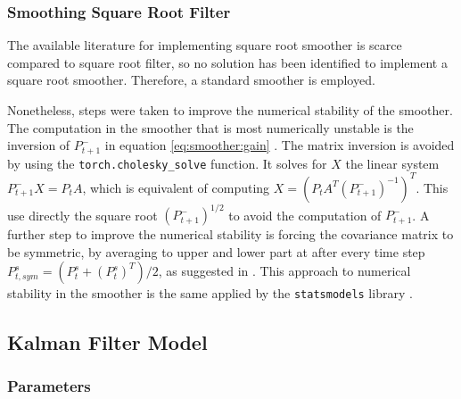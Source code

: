 \documentclass{article}
\let\Oldsubsection\subsection
\renewcommand{\subsection}{\FloatBarrier\Oldsubsection}
\begin{document}
\subsubsection{Smoothing Square Root Filter}

The available literature for implementing square root smoother is scarce compared to square root filter, so no solution has been identified to implement a square root smoother. Therefore, a standard smoother is employed.

Nonetheless, steps were taken to improve the numerical stability of the smoother. The computation in the smoother that is most numerically unstable is the inversion of $P^-_{t+1}$ in equation \ref{eq:smoother:gain} \cite{mohinder_s_grewal_kalman_2001}. The matrix inversion is avoided by using the \verb|torch.cholesky_solve| function. It solves for $X$ the linear system $P^-_{t+1}X=P_tA$, which is equivalent of computing $X = (P_tA^T(P^-_{t+1})^{-1})^T$. This use directly the square root $(P^-_{t+1})^{1/2}$ to avoid the computation of $P^-_{t+1}$. A further step to improve the numerical stability is forcing the covariance matrix to be symmetric, by averaging to upper and lower part at after every time step $P^s_{t, sym} = (P^s_t + (P^s_t)^T)/2$, as suggested in \cite{dan_simon_optimal_2006}.
This approach to numerical stability in the smoother is the same applied by the \texttt{statsmodels} library \cite{noauthor_statsmodelstsastatespacekalman_filterkalmanfilter_nodate}.

\subsection{Kalman Filter Model}

\subsubsection{Parameters}
\end{document}
